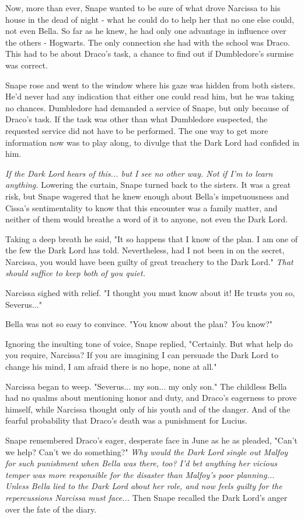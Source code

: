 \documentclass[a4paper,11pt]{article}
\begin{document}
Now, more than ever, Snape wanted to be sure of what drove Narcissa to his house in the dead of night - what he could do to help her that no one else could, not even Bella. So far as he knew, he had only one advantage in influence over the others - Hogwarts. The only connection she had with the school was Draco. This had to be about Draco's task, a chance to find out if Dumbledore's surmise was correct.

Snape rose and went to the window where his gaze was hidden from both sisters. He'd never had any indication that either one could read him, but he was taking no chances. Dumbledore had demanded a service of Snape, but only because of Draco's task. If the task was other than what Dumbledore suspected, the requested service did not have to be performed. The one way to get more information now was to play along, to divulge that the Dark Lord had confided in him.

\emph{If the Dark Lord hears of this... but I see no other way. Not if I'm to learn anything.} Lowering the curtain, Snape turned back to the sisters. It was a great risk, but Snape wagered that he knew enough about Bella's impetuousness and Cissa's sentimentality to know that this encounter was a family matter, and neither of them would breathe a word of it to anyone, not even the Dark Lord.

Taking a deep breath he said, "It so happens that I know of the plan. I am one of the few the Dark Lord has told. Nevertheless, had I not been in on the secret, Narcissa, you would have been guilty of great treachery to the Dark Lord." \emph{That should suffice to keep both of you quiet.}

Narcissa sighed with relief. "I thought you must know about it! He trusts you so, Severus..."

Bella was not so easy to convince. "You know about the plan? \emph{You} know?"

Ignoring the insulting tone of voice, Snape replied, "Certainly. But what help do you require, Narcissa? If you are imagining I can persuade the Dark Lord to change his mind, I am afraid there is no hope, none at all."

Narcissa began to weep. "Severus... my son... my only son." The childless Bella had no qualms about mentioning honor and duty, and Draco's eagerness to prove himself, while Narcissa thought only of his youth and of the danger. And of the fearful probability that Draco's death was a punishment for Lucius.

Snape remembered Draco's eager, desperate face in June as he as pleaded, "Can't we help? Can't we do something?" \emph{Why would the Dark Lord single out Malfoy for such punishment when Bella was there, too? I'd bet anything her vicious temper was more responsible for the disaster than Malfoy's poor planning... Unless Bella lied to the Dark Lord about her role, and now feels guilty for the repercussions Narcissa must face...} Then Snape recalled the Dark Lord's anger over the fate of the diary.
\end{document}
